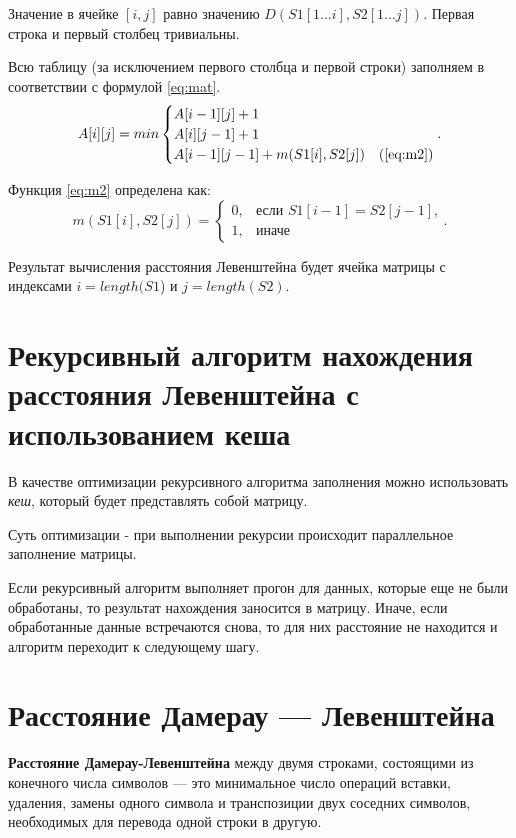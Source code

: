 Значение в ячейке $[i, j]$ равно значению $D(S1[1...i], S2[1...j])$. Первая строка и первый столбец тривиальны. 

Всю таблицу (за исключением первого столбца и первой строки) заполняем в соответствии с формулой \ref{eq:mat}.
\begin{equation}
	\label{eq:mat}
	A[i][j] = min \begin{cases}
		A[i-1][j] + 1\\
		A[i][j-1] + 1\\
		A[i-1][j-1] + m(S1[i], S2[j])&\text(\ref{eq:m2})\\
	\end{cases}.
\end{equation}

Функция \ref{eq:m2} определена как:
\begin{equation}
	\label{eq:m2}
	m(S1[i], S2[j]) = \begin{cases}
		0, &\text{если $S1[i - 1] = S2[j - 1]$,}\\
		1, &\text{иначе}
	\end{cases}.
\end{equation}

Результат вычисления расстояния Левенштейна будет ячейка матрицы с индексами $i = length(S1$) и $j = length(S2)$.

\section{Рекурсивный алгоритм нахождения расстояния Левенштейна с использованием кеша}

В качестве оптимизации рекурсивного алгоритма заполнения можно использовать \textit{кеш}, который будет представлять собой матрицу.

Суть оптимизации - при выполнении рекурсии происходит параллельное заполнение матрицы.

Если рекурсивный алгоритм выполняет прогон для данных, которые еще не были обработаны, то результат нахождения заносится в матрицу. Иначе, если обработанные данные встречаются снова, то для них расстояние не находится и алгоритм переходит к следующему шагу.


\section{Расстояние Дамерау — Левенштейна}

\textbf{Расстояние Дамерау-Левенштейна} между двумя строками, состоящими из конечного числа символов — это минимальное число операций вставки, удаления, замены одного символа и транспозиции двух соседних символов, необходимых для перевода одной строки в другую. 

